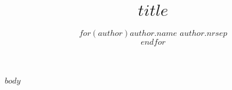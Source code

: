\documentclass[12pt]{sprawozdanie}
\title{$title$}
\author{$for(author)$$author.name$ $author.nr$$sep$\\$endfor$}
\begin{document}
\maketitle
$body$
\end{document}
